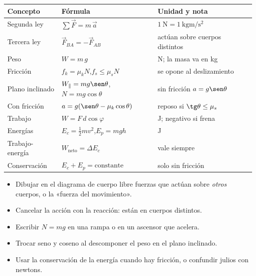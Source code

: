 \documentclass[11pt,a4paper]{article}
\begin{document}
\repaso
\begin{center}
\begin{tabularx}{\linewidth}{@{}l >{\raggedright\arraybackslash}p{64mm} L@{}}
\toprule
Concepto & Fórmula & Unidad y nota\\ \midrule
Segunda ley & $\sum\vec F=m\,\vec a$ & $\SI{1}{\newton}=\SI{1}{\kilo\gram\meter\per\second\squared}$\\
Tercera ley & $\vec F_{BA}=-\vec F_{AB}$ & actúan sobre cuerpos distintos\\
Peso & $W=m\,g$ & \si{\newton}; la masa va en \si{\kilo\gram}\\
Fricción & $f_k=\mu_kN$,\quad $f_s\le\mu_sN$ & se opone al deslizamiento\\
Plano inclinado & $W_\parallel=mg\sen\theta$,\quad $N=mg\cos\theta$ & sin fricción $a=g\sen\theta$\\
Con fricción & $a=g(\sen\theta-\mu_k\cos\theta)$ & reposo si $\tg\theta\le\mu_s$\\
Trabajo & $W=F\,d\cos\varphi$ & \si{\joule}; negativo si frena\\
Energías & $E_c=\tfrac12mv^2$,\quad $E_p=mgh$ & \si{\joule}\\
Trabajo-energía & $W_{\text{neto}}=\Delta E_c$ & vale siempre\\
Conservación & $E_c+E_p=\text{constante}$ & solo sin fricción\\
\bottomrule
\end{tabularx}
\end{center}

\begin{ojo}
\begin{itemize}
\item Dibujar en el diagrama de cuerpo libre fuerzas que actúan sobre \emph{otros} cuerpos, o la «fuerza del movimiento».
\item Cancelar la acción con la reacción: están en cuerpos distintos.
\item Escribir $N=mg$ en una rampa o en un ascensor que acelera.
\item Trocar seno y coseno al descomponer el peso en el plano inclinado.
\item Usar la conservación de la energía cuando hay fricción, o confundir julios con newtons.
\end{itemize}
\end{ojo}
\end{document}
